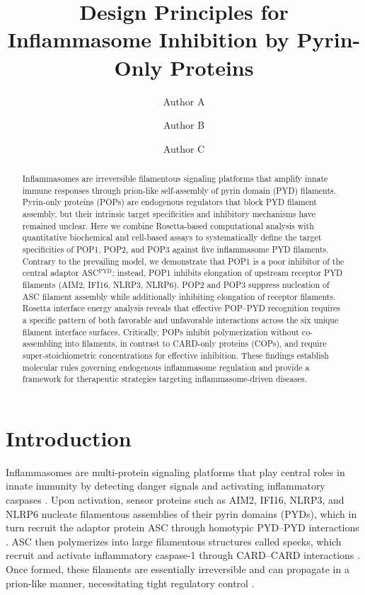 \documentclass[11pt,a4paper]{article}
\title{Design Principles for Inflammasome Inhibition by Pyrin-Only Proteins}
\author[1]{Author A}
\author[1]{Author B}
\author[1,2]{Author C}
\affil[1]{Department of Biochemistry, Boston University School of Medicine, Boston, MA, USA}
\affil[2]{Corresponding author: \texttt{author.c@bu.edu}}
\date{}
\begin{document}
\maketitle

\begin{abstract}
Inflammasomes are irreversible filamentous signaling platforms that amplify innate immune responses through prion-like self-assembly of pyrin domain (PYD) filaments. Pyrin-only proteins (POPs) are endogenous regulators that block PYD filament assembly, but their intrinsic target specificities and inhibitory mechanisms have remained unclear. Here we combine Rosetta-based computational analysis with quantitative biochemical and cell-based assays to systematically define the target specificities of POP1, POP2, and POP3 against five inflammasome PYD filaments. Contrary to the prevailing model, we demonstrate that POP1 is a poor inhibitor of the central adaptor ASC$^{\text{PYD}}$; instead, POP1 inhibits elongation of upstream receptor PYD filaments (AIM2, IFI16, NLRP3, NLRP6). POP2 and POP3 suppress nucleation of ASC filament assembly while additionally inhibiting elongation of receptor filaments. Rosetta interface energy analysis reveals that effective POP--PYD recognition requires a specific pattern of both favorable and unfavorable interactions across the six unique filament interface surfaces. Critically, POPs inhibit polymerization without co-assembling into filaments, in contrast to CARD-only proteins (COPs), and require super-stoichiometric concentrations for effective inhibition. These findings establish molecular rules governing endogenous inflammasome regulation and provide a framework for therapeutic strategies targeting inflammasome-driven diseases.
\end{abstract}

\section{Introduction}

Inflammasomes are multi-protein signaling platforms that play central roles in innate immunity by detecting danger signals and activating inflammatory caspases \citep{Martinon2002, Broz2016, Lamkanfi2014}. Upon activation, sensor proteins such as AIM2, IFI16, NLRP3, and NLRP6 nucleate filamentous assemblies of their pyrin domains (PYDs), which in turn recruit the adaptor protein ASC through homotypic PYD--PYD interactions \citep{Lu2014, Dick2016}. ASC then polymerizes into large filamentous structures called specks, which recruit and activate inflammatory caspase-1 through CARD--CARD interactions \citep{Cai2014, Schmidt2016}. Once formed, these filaments are essentially irreversible and can propagate in a prion-like manner, necessitating tight regulatory control \citep{Cai2014, Franklin2014}.
\end{document}
